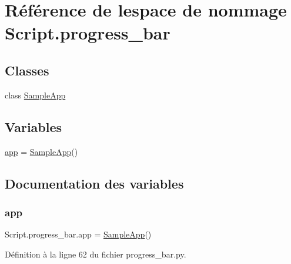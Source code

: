 \hypertarget{namespaceScript_1_1progress__bar}{}\section{Référence de l\textquotesingle{}espace de nommage Script.\+progress\+\_\+bar}
\label{namespaceScript_1_1progress__bar}
\subsection*{Classes}
\begin{DoxyCompactItemize}
\item 
class \hyperlink{classScript_1_1progress__bar_1_1SampleApp}{Sample\+App}
\end{DoxyCompactItemize}
\subsection*{Variables}
\begin{DoxyCompactItemize}
\item 
\hyperlink{namespaceScript_1_1progress__bar_a2346ccb846bab632249778f76d43e342}{app} = \hyperlink{classScript_1_1progress__bar_1_1SampleApp}{Sample\+App}()
\end{DoxyCompactItemize}


\subsection{Documentation des variables}
\mbox{\label{namespaceScript_1_1progress__bar_a2346ccb846bab632249778f76d43e342}} 
\subsubsection{\texorpdfstring{app}{app}}
{\footnotesize\ttfamily Script.\+progress\+\_\+bar.\+app = \hyperlink{classScript_1_1progress__bar_1_1SampleApp}{Sample\+App}()}



Définition à la ligne 62 du fichier progress\+\_\+bar.\+py.

